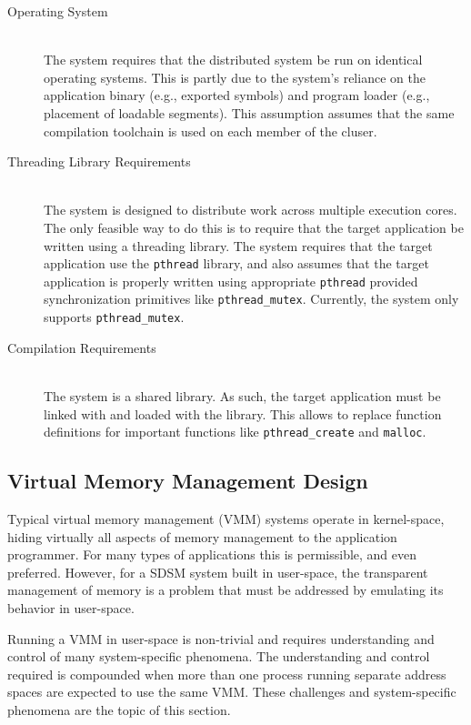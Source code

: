 \begin{description}
\item[Operating System] \hfill \\
The \projname{} system requires that the distributed system be run on identical operating systems.  This is partly due to the system's reliance on the application binary (e.g., exported symbols) and program loader (e.g., placement of loadable segments).  This assumption assumes that the same compilation toolchain is used on each member of the cluser.

\item[Threading Library Requirements] \hfill \\
 The \projname{} system is designed to distribute work across multiple execution cores.  The only feasible way to do this is to require that the target application be written using a threading library.  The \projname{} system requires that the target application use the \verb,pthread, library, and also assumes that the target application is properly written using appropriate \verb,pthread, provided synchronization primitives like \verb,pthread_mutex,.  Currently, the \projname{} system only supports \verb,pthread_mutex,.

\item[Compilation Requirements] \hfill \\
The \projname{} system is a shared library.  As such, the target application must be linked with and loaded with the \projname{} library.  This allows \projname{} to replace function definitions for important functions like \verb,pthread_create, and \verb,malloc,.
\end{description}


\subsection{Virtual Memory Management Design}
\label{vmm-design}

Typical virtual memory management (VMM) systems operate in kernel-space, hiding virtually all aspects of memory management to the application programmer.  For many types of applications this is permissible, and even preferred.  However, for a SDSM system built in user-space, the transparent management of memory is a problem that must be addressed by emulating its behavior in user-space.

Running a VMM in user-space is non-trivial and requires understanding and control of many system-specific phenomena.  The understanding and control required is compounded when more than one process running separate address spaces are expected to use the same VMM.  These challenges and system-specific phenomena are the topic of this section.

